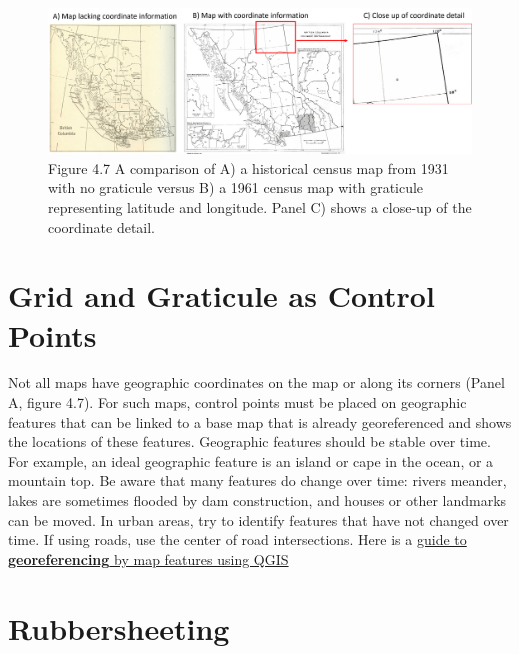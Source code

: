 \documentclass[
]{book}
\begin{document}
\begin{figure}
\centering
\includegraphics{images/04-control-points.png}
\caption{Figure 4.7 A comparison of A) a historical census map from 1931 with no graticule versus B) a 1961 census map with graticule representing latitude and longitude. Panel C) shows a close-up of the coordinate detail.}
\end{figure}

\hypertarget{grid-and-graticule-as-control-points}{%
\section{Grid and Graticule as Control Points}\label{grid-and-graticule-as-control-points}}

Not all maps have geographic coordinates on the map or along its corners (Panel A, figure 4.7). For such maps, control points must be placed on geographic features that can be linked to a base map that is already georeferenced and shows the locations of these features. Geographic features should be stable over time. For example, an ideal geographic feature is an island or cape in the ocean, or a mountain top. Be aware that many features do change over time: rivers meander, lakes are sometimes flooded by dam construction, and houses or other landmarks can be moved. In urban areas, try to identify features that have not changed over time. If using roads, use the center of road intersections. Here is a \href{https://guides.lib.utexas.edu/georeference-raster-data/qgis-georeference-by-map-features}{guide to \textbf{georeferencing} by map features using QGIS}

\hypertarget{rubbersheeting}{%
\section{Rubbersheeting}\label{rubbersheeting}}
\end{document}
